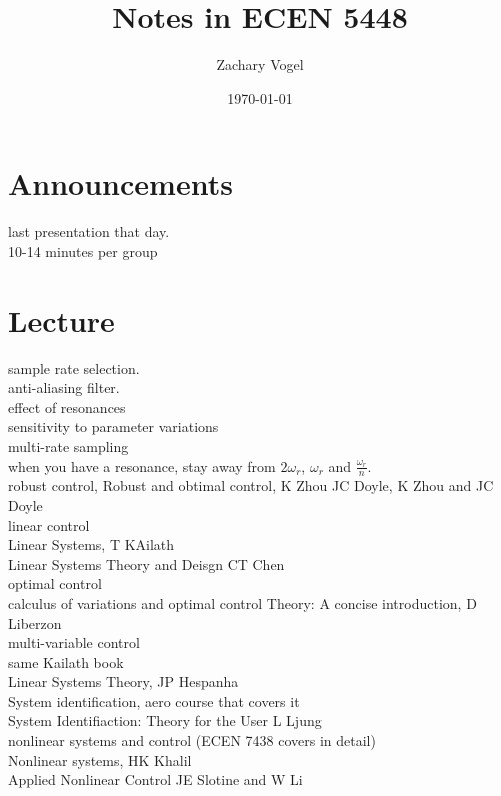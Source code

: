\documentclass{article}
\author{Zachary Vogel}
\date{\today}
\title{Notes in ECEN 5448}
\begin{document}
\maketitle


\section*{Announcements}
last presentation that day.\\
10-14 minutes per group\\

\section*{Lecture}
sample rate selection.\\

anti-aliasing filter.\\

effect of resonances\\
sensitivity to parameter variations\\
multi-rate sampling\\

when you have a resonance, stay away from $2\omega_r$, $\omega_r$ and $\frac{\omega_r}{n}$.\\

robust control, Robust and obtimal control, K Zhou JC Doyle, K Zhou and JC Doyle\\

linear control\\
Linear Systems, T KAilath\\
Linear Systems Theory and Deisgn CT Chen\\

optimal control\\
calculus of variations and optimal control Theory: A concise introduction, D Liberzon\\

multi-variable control\\
same Kailath book\\
Linear Systems Theory, JP Hespanha\\

System identification, aero course that covers it\\
System Identifiaction: Theory for the User L Ljung\\

nonlinear systems and control (ECEN 7438 covers in detail)\\
Nonlinear systems, HK Khalil\\
Applied Nonlinear Control JE Slotine and W Li\\
\end{document}
